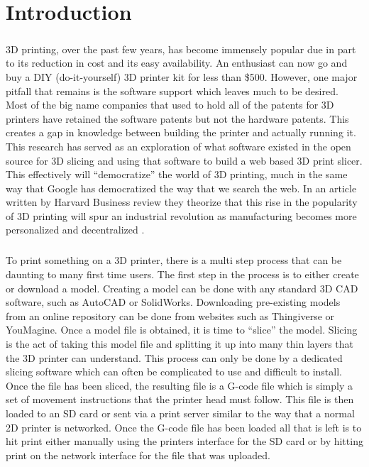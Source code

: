 \chapter{Introduction}
\paragraph{}
\citep{reprap-2011}
3D printing, over the past few years, has become immensely popular due in part to its reduction in cost and its easy availability.
An enthusiast can now go and buy a DIY (do-it-yourself) 3D printer kit for less than \$500.
However, one major pitfall that remains is the software support which leaves much to be desired.
Most of the big name companies that used to hold all of the patents for 3D printers have retained the software patents but not the hardware patents. 
This creates a gap in knowledge between building the printer and actually running it.
This research has served as an exploration of what software existed in the open source for 3D slicing and using that software to build a web based 3D print slicer.
This effectively will “democratize” the world of 3D printing, much in the same way that Google has democratized the way that we search the web. 
In an article written by Harvard Business review they theorize that this rise in the popularity of 3D printing will spur an industrial revolution as manufacturing becomes more personalized and decentralized \citep{daveni-2015}.

\paragraph{}
To print something on a 3D printer, there is a multi step process that can be daunting to many first time users. 
The first step in the process is to either create or download a model.
Creating a model can be done with any standard 3D CAD software, such as AutoCAD or SolidWorks.
Downloading pre-existing models from an online repository can be done from websites such as Thingiverse or YouMagine.
Once a model file is obtained, it is time to “slice” the model.
Slicing is the act of taking this model file and splitting it up into many thin layers that the 3D printer can understand.
This process can only be done by a dedicated slicing software which can often be complicated to use and difficult to install.
Once the file has been sliced, the resulting file is a G-code file which is simply a set of movement instructions that the printer head must follow.
This file is then loaded to an SD card or sent via a print server similar to the way that a normal 2D printer is networked.
Once the G-code file has been loaded all that is left is to hit print either manually using the printers interface for the SD card or by hitting print on the network interface for the file that was uploaded.

